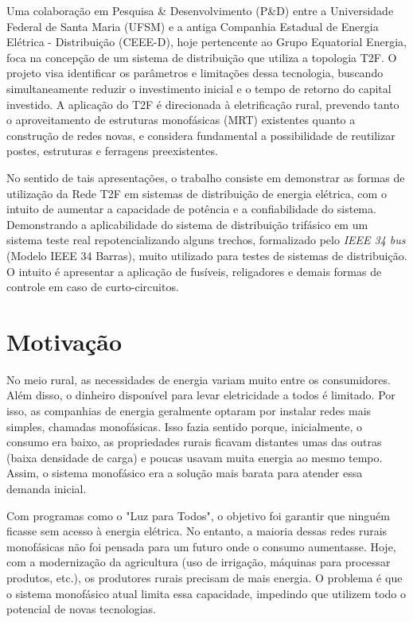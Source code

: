 \documentclass[oneside,openright,12pt]{ufsm_2021} %
\begin{document}
\par Uma colaboração em Pesquisa \& Desenvolvimento (P\&D) entre a Universidade Federal de Santa Maria (UFSM) e a antiga Companhia Estadual de Energia Elétrica - Distribuição (CEEE-D), hoje pertencente ao Grupo Equatorial Energia, foca na concepção de um sistema de distribuição que utiliza a topologia T2F. O projeto visa identificar os parâmetros e limitações dessa tecnologia, buscando simultaneamente reduzir o investimento inicial e o tempo de retorno do capital investido. A aplicação do T2F é direcionada à eletrificação rural, prevendo tanto o aproveitamento de estruturas monofásicas (MRT) existentes quanto a construção de redes novas, e considera fundamental a possibilidade de reutilizar postes, estruturas e ferragens preexistentes.

\par No sentido de tais apresentações, o trabalho consiste em demonstrar as formas de utilização da Rede T2F em sistemas de distribuição de energia elétrica, com o intuito de aumentar a capacidade de potência e a confiabilidade do sistema. Demonstrando a aplicabilidade do sistema de distribuição trifásico em um sistema teste real repotencializando alguns trechos, formalizado pelo \textit{IEEE 34 bus} (Modelo IEEE 34 Barras), muito utilizado para testes de sistemas de distribuição. O intuito é apresentar a aplicação de fusíveis, religadores e demais formas de controle em caso de curto-circuitos.

\section{Motivação}

\par No meio rural, as necessidades de energia variam muito entre os consumidores. Além disso, o dinheiro disponível para levar eletricidade a todos é limitado. Por isso, as companhias de energia geralmente optaram por instalar redes mais simples, chamadas monofásicas. Isso fazia sentido porque, inicialmente, o consumo era baixo, as propriedades rurais ficavam distantes umas das outras (baixa densidade de carga) e poucas usavam muita energia ao mesmo tempo. Assim, o sistema monofásico era a solução mais barata para atender essa demanda inicial.

\par Com programas como o "Luz para Todos", o objetivo foi garantir que ninguém ficasse sem acesso à energia elétrica. No entanto, a maioria dessas redes rurais monofásicas não foi pensada para um futuro onde o consumo aumentasse. Hoje, com a modernização da agricultura (uso de irrigação, máquinas para processar produtos, etc.), os produtores rurais precisam de mais energia. O problema é que o sistema monofásico atual limita essa capacidade, impedindo que utilizem todo o potencial de novas tecnologias.
\end{document}
